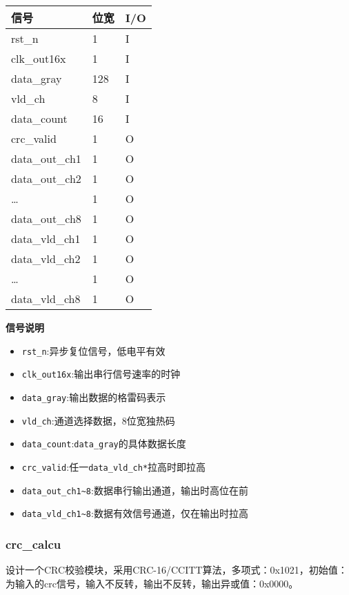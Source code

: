 \documentclass[12pt,]{article}
\providecommand{\tightlist}{%
  \setlength{\itemsep}{0pt}\setlength{\parskip}{0pt}}
\begin{document}
\begin{longtable}[]{@{}lll@{}}
\toprule\noalign{}
信号 & 位宽 & I/O \\
\midrule\noalign{}
\endhead
\bottomrule\noalign{}
\endlastfoot
rst\_n & 1 & I \\
clk\_out16x & 1 & I \\
data\_gray & 128 & I \\
vld\_ch & 8 & I \\
data\_count & 16 & I \\
crc\_valid & 1 & O \\
data\_out\_ch1 & 1 & O \\
data\_out\_ch2 & 1 & O \\
\ldots{} & 1 & O \\
data\_out\_ch8 & 1 & O \\
data\_vld\_ch1 & 1 & O \\
data\_vld\_ch2 & 1 & O \\
\ldots{} & 1 & O \\
data\_vld\_ch8 & 1 & O \\
\end{longtable}

\textbf{信号说明}

\begin{itemize}
\tightlist
\item
  \texttt{rst\_n}:异步复位信号，低电平有效
\item
  \texttt{clk\_out16x}:输出串行信号速率的时钟
\item
  \texttt{data\_gray}:输出数据的格雷码表示
\item
  \texttt{vld\_ch}:通道选择数据，8位宽独热码
\item
  \texttt{data\_count}:\texttt{data\_gray}的具体数据长度
\item
  \texttt{crc\_valid}:任一\texttt{data\_vld\_ch*}拉高时即拉高
\item
  \texttt{data\_out\_ch1\textasciitilde{}8}:数据串行输出通道，输出时高位在前
\item
  \texttt{data\_vld\_ch1\textasciitilde{}8}:数据有效信号通道，仅在输出时拉高
\end{itemize}

\hypertarget{crc_calcu}{%
\subsubsection{crc\_calcu}\label{crc_calcu}}

设计一个CRC校验模块，采用CRC-16/CCITT算法，多项式：0x1021，初始值：为输入的crc信号，输入不反转，输出不反转，输出异或值：0x0000。
\end{document}
